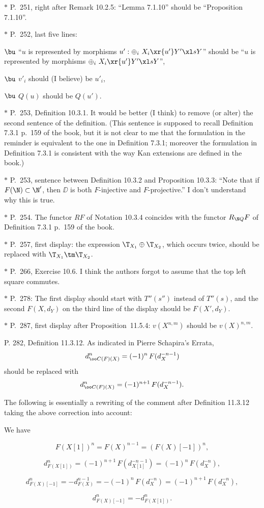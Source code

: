 \documentclass[12pt]{article}
\theoremstyle{remark}
\theoremstyle{definition}
\begin{document}
\nn$*$ P.~251, right after Remark 10.2.5: ``Lemma 7.1.10'' should be ``Proposition 7.1.10''.

\nn$*$ P.~252, last five lines:

$\bu$ ``$u$ is represented by morphisms $u':\oplus_i\ X_i\xr{u'}Y'\xl sY$'' should be ``$u$ is represented by morphisms $\oplus_i\ X_i\xr{u'}Y'\xl sY$'',

$\bu$ $v'_i$ should (I believe) be $u'_i$,

$\bu$ $Q(u)$ should be $Q(u')$.

\nn$*$ P.~253, Definition 10.3.1. It would be better (I think) to remove (or alter) the second sentence of the definition. (This sentence is supposed to recall Definition 7.3.1 p.~159 of the book, but it is not clear to me that the formulation in the reminder is equivalent to the one in Definition 7.3.1; moreover the formulation in Definition 7.3.1 is consistent with the way Kan extensions are defined in the book.)

\nn$*$ P.~253, sentence between Definition 10.3.2 and Proposition 10.3.3: ``Note that if $F(\N)\subset\N'$, then $\DD$ is both $F$-injective and $F$-projective.'' I don't understand why this is true.

\nn$*$ P.~254. The functor $RF$ of Notation 10.3.4 coincides with the functor $R_{\N Q}F$ of Definition 7.3.1 p.~159 of the book.

\nn$*$ P.~257, first display: the expression $\T_{X_1}\oplus\T_{X_2}$, which occurs twice, should be replaced with $\T_{X_1}\tm\T_{X_2}$.

\nn$*$ P.~266, Exercise 10.6. I think the authors forgot to assume that the top left square commutes.

\nn$*$ P.~278: The first display should start with $T''(s'')$ instead of $T''(s)$, and the second $F(X,d_Y)$ on the third line of the display should be $F(X',d_Y)$.

\nn$*$ P.~287, first display after Proposition~11.5.4: $v(X^{n,m})$ should be $v(X)^{n,m}$.

\begin{s}
P. 282, Definition 11.3.12. As indicated in Pierre Schapira's Errata, 
$$
d^n_{\oo C(F)(X)}=(-1)^n\,F(d_X^{-n-1})
$$ 
should be replaced with 
$$
d^n_{\oo C(F)(X)}=(-1)^{n+1}\,F(d_X^{-n-1}).
$$ 

The following is essentially a rewriting of the comment after Definition 11.3.12 taking the above correction into account:

We have 

$$F(X[1])^n=F(X)^{n-1}=(F(X)[-1])^n,$$ 

$$d^n_{F(X[1])}=(-1)^{n+1}\,F(d_{X[1]}^{-n-1})=(-1)^n\,F(d_X^{-n}),$$ 

$$d^n_{F(X)[-1]}=-d_{F(X)}^{n-1}=-(-1)^n\,F(d_X^{-n})=(-1)^{n+1}\,F(d_X^{-n}),$$ 

$$d^n_{F(X)[-1]}=-d^n_{F(X[1])}.$$
\end{s}
\end{document}
